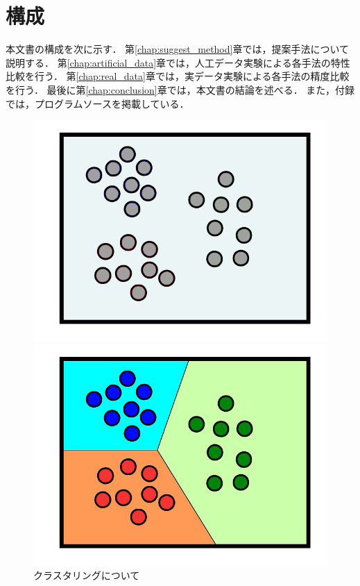 \documentclass[a4j,12pt,dvipdfmx,oneside]{jsbook}
\theoremstyle{definition}
\begin{document}
 \section{構成}\label{sec:contents}
 本文書の構成を次に示す．
 第\ref{chap:suggest_method}章では，提案手法について説明する．
 第\ref{chap:artificial_data}章では，人工データ実験による各手法の特性比較を行う．
 第\ref{chap:real_data}章では，実データ実験による各手法の精度比較を行う．
 最後に第\ref{chap:conclusion}章では，本文書の結論を述べる．
 また，付録では，プログラムソースを掲載している．

 \begin{figure}[htbp]
  \centering
  \begin{minipage}{0.4\hsize}
   \includegraphics[width=\linewidth]{before_clustering.pdf}
  \end{minipage}
  \begin{minipage}{0.4\hsize}
   \includegraphics[width=\linewidth]{after_clustering.pdf}
  \end{minipage}
  \caption{クラスタリングについて}
  \label{fig:about_clustering}
 \end{figure}
\end{document}
